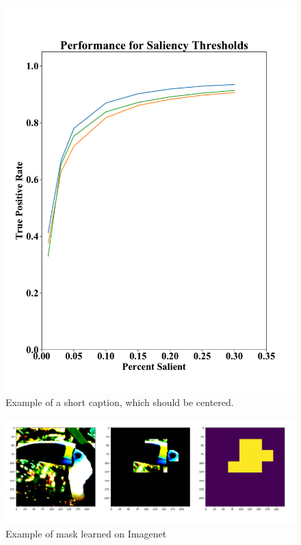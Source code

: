 \documentclass[10pt,twocolumn,letterpaper]{article}
\begin{document}
\begin{figure}
\begin{center}
\includegraphics[width=\columnwidth]{figures/tpr.pdf}

\end{center}
   \caption{Example of a short caption, which should be centered.}
\label{fig:short}
\end{figure}


\begin{figure}
	\begin{center}
		\includegraphics[width=\columnwidth]{figures/bird_mask_predict.png}
		
	\end{center}
	\caption{Example of mask learned on Imagenet}
	\label{fig:short}
\end{figure}
\end{document}
